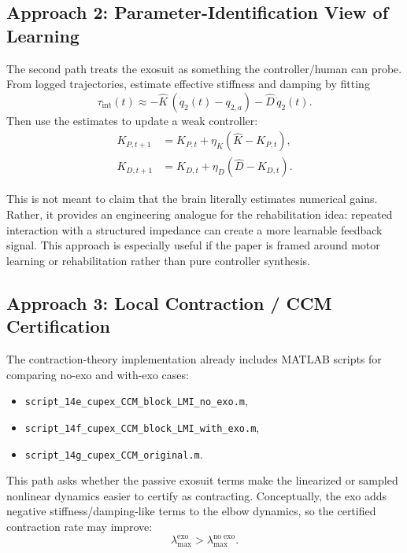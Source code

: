\documentclass[11pt]{article}
\begin{document}
\subsection{Approach 2: Parameter-Identification View of Learning}
The second path treats the exosuit as something the controller/human can probe.  From logged trajectories, estimate effective stiffness and damping by fitting
\begin{equation}
    \tau_{\mathrm{int}}(t) \approx -\hat{K}\,(q_2(t)-q_{2,a}) - \hat{D}\,\dot{q}_2(t).
\end{equation}
Then use the estimates to update a weak controller:
\begin{align}
    K_{P,t+1} &= K_{P,t} + \eta_K(\hat{K}-K_{P,t}), \\
    K_{D,t+1} &= K_{D,t} + \eta_D(\hat{D}-K_{D,t}).
\end{align}

This is not meant to claim that the brain literally estimates numerical gains.  Rather, it provides an engineering analogue for the rehabilitation idea: repeated interaction with a structured impedance can create a more learnable feedback signal.  This approach is especially useful if the paper is framed around motor learning or rehabilitation rather than pure controller synthesis.

\subsection{Approach 3: Local Contraction / CCM Certification}
The contraction-theory implementation already includes MATLAB scripts for comparing no-exo and with-exo cases:
\begin{itemize}[leftmargin=1.5em]
    \item \texttt{script\_14e\_cupex\_CCM\_block\_LMI\_no\_exo.m},
    \item \texttt{script\_14f\_cupex\_CCM\_block\_LMI\_with\_exo.m},
    \item \texttt{script\_14g\_cupex\_CCM\_original.m}.
\end{itemize}
This path asks whether the passive exosuit terms make the linearized or sampled nonlinear dynamics easier to certify as contracting.  Conceptually, the exo adds negative stiffness/damping-like terms to the elbow dynamics, so the certified contraction rate may improve:
\begin{equation}
    \lambda_{\max}^{\mathrm{exo}} > \lambda_{\max}^{\mathrm{no\;exo}}.
\end{equation}
\end{document}

